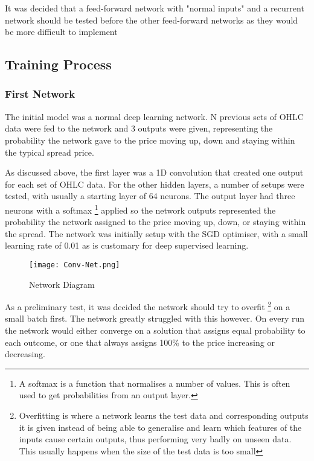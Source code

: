         It was decided that a feed-forward network with "normal inputs" and a recurrent network should be tested before the other feed-forward networks as they would be more difficult to implement


        \subsection{Training Process}

            \subsubsection{First Network}
            The initial model was a normal deep learning network. N previous sets of OHLC data were fed to the network and 3 outputs were given, representing the probability the network gave to the price moving up, down and staying within the typical spread price.

            As discussed above, the first layer was a 1D convolution that created one output for each set of OHLC data. For the other hidden layers, a number of setups were tested, with usually a starting layer of 64 neurons. The output layer had three neurons with a softmax \footnote{A softmax is a function that normalises a number of values. This is often used to get probabilities from an output layer.} applied so the network outputs represented the probability the network assigned to the price moving up, down, or staying within the spread. The network was initially setup with the SGD optimiser, with a small learning rate of 0.01 as is customary for deep supervised learning.
            
            \begin{figure}[h]
                \centering
                \texttt{[image: Conv-Net.png]}
                \caption{Network Diagram}
                \label{fig:first_net_diagram}
            \end{figure}

            As a preliminary test, it was decided the network should try to overfit \footnote{Overfitting is where a network learns the test data and corresponding outputs it is given instead of being able to generalise and learn which features of the inputs cause certain outputs, thus performing very badly on unseen data. This usually happens when the size of the test data is too small} on a small batch first. The network greatly struggled with this however. On every run the network would either converge on a solution that assigns equal probability to each outcome, or one that always assigns 100\% to the price increasing or decreasing.

